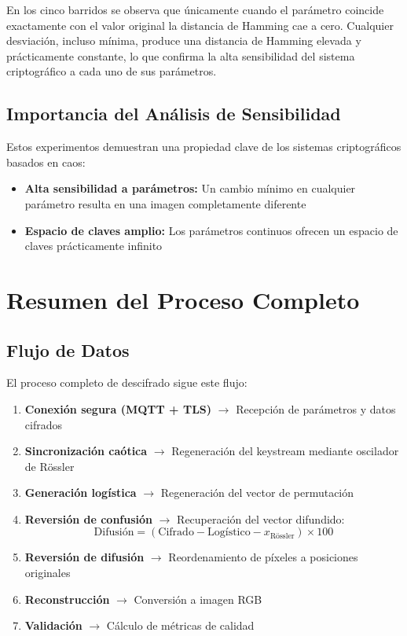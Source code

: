 \documentclass[12pt,a4paper]{article}
\begin{document}
	En los cinco barridos se observa que únicamente cuando el parámetro coincide exactamente con el valor original la distancia de Hamming cae a cero. Cualquier desviación, incluso mínima, produce una distancia de Hamming elevada y prácticamente constante, lo que confirma la alta sensibilidad del sistema criptográfico a cada uno de sus parámetros.
	
	\subsection{Importancia del Análisis de Sensibilidad}
	
	Estos experimentos demuestran una propiedad clave de los sistemas criptográficos basados en caos:
	
	\begin{itemize}
		\item \textbf{Alta sensibilidad a parámetros:} Un cambio mínimo en cualquier parámetro resulta en una imagen completamente diferente
		\item \textbf{Espacio de claves amplio:} Los parámetros continuos ofrecen un espacio de claves prácticamente infinito
	\end{itemize}
	
	\section{Resumen del Proceso Completo}
	
	\subsection{Flujo de Datos}
	
	El proceso completo de descifrado sigue este flujo:
	
	\begin{enumerate}
		\item \textbf{Conexión segura (MQTT + TLS)} $\rightarrow$ Recepción de parámetros y datos cifrados
		
		\item \textbf{Sincronización caótica} $\rightarrow$ Regeneración del keystream mediante oscilador de Rössler
		
		\item \textbf{Generación logística} $\rightarrow$ Regeneración del vector de permutación
		
		\item \textbf{Reversión de confusión} $\rightarrow$ Recuperación del vector difundido:
		$$\text{Difusión} = (\text{Cifrado} - \text{Logístico} - x_{\text{Rössler}}) \times 100$$
		
		\item \textbf{Reversión de difusión} $\rightarrow$ Reordenamiento de píxeles a posiciones originales
		
		\item \textbf{Reconstrucción} $\rightarrow$ Conversión a imagen RGB
		
		\item \textbf{Validación} $\rightarrow$ Cálculo de métricas de calidad
	\end{enumerate}
	
\end{document}
